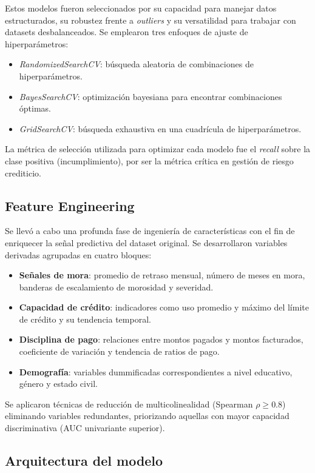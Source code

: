 \documentclass[journal]{apa7}
\begin{document}
Estos modelos fueron seleccionados por su capacidad para manejar datos estructurados, su robustez frente a \emph{outliers} y su versatilidad para trabajar con datasets desbalanceados. Se emplearon tres enfoques de ajuste de hiperparámetros:

\begin{itemize}
  \item \emph{RandomizedSearchCV}: búsqueda aleatoria de combinaciones de hiperparámetros.
  \item \emph{BayesSearchCV}: optimización bayesiana para encontrar combinaciones óptimas.
  \item \emph{GridSearchCV}: búsqueda exhaustiva en una cuadrícula de hiperparámetros.
\end{itemize}

La métrica de selección utilizada para optimizar cada modelo fue el \emph{recall} sobre la clase positiva (incumplimiento), por ser la métrica crítica en gestión de riesgo crediticio.

\subsection{Feature Engineering}

Se llevó a cabo una profunda fase de ingeniería de características con el fin de enriquecer la señal predictiva del dataset original. Se desarrollaron variables derivadas agrupadas en cuatro bloques:

\begin{itemize}
  \item \textbf{Señales de mora}: promedio de retraso mensual, número de meses en mora, banderas de escalamiento de morosidad y severidad.
  \item \textbf{Capacidad de crédito}: indicadores como uso promedio y máximo del límite de crédito y su tendencia temporal.
  \item \textbf{Disciplina de pago}: relaciones entre montos pagados y montos facturados, coeficiente de variación y tendencia de ratios de pago.
  \item \textbf{Demografía}: variables dummificadas correspondientes a nivel educativo, género y estado civil.
\end{itemize}

Se aplicaron técnicas de reducción de multicolinealidad (Spearman $\rho \geq 0.8$) eliminando variables redundantes, priorizando aquellas con mayor capacidad discriminativa (AUC univariante superior).

\subsection{Arquitectura del modelo}
\end{document}
